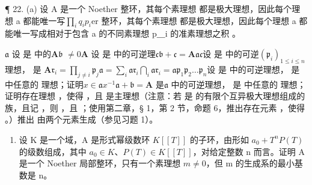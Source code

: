 ¶ 22. (a) 设 A 是一个 Noether 整环，其每个素理想  都是极大理想，因此每个理想 a  都能唯一写\(\prod_{i} q_{i}\)\(p_{i}\)er 整环，其每个素理想  都是极大理想，因此每个理想 a  都能唯一写成相对于包含 a 的不同素理想 p＿i 的准素理想之积 。

 \(\mathfrak{a}\) 设  是  中的\(\mathbf{A}\)\(\mathfrak{b}\)  \(\neq 0\)\(\mathbf{A}\) 设  是  中的可逆理\(\mathfrak{c}\)\(\mathfrak{b} + \mathfrak{c} = \mathbf{A}\)\(\mathfrak{ac}\)设  是  中的可逆\((\mathfrak{p}_i)_{1 \leqslant i \leqslant n}\)理想， 是 \(\mathbf{A}\)\(\mathfrak{r}_i = \prod_{j \neq i} \mathfrak{p}_j\)\(\mathfrak{a} = \sum_i \mathfrak{ar}_i\)\(\bigcap_i \mathfrak{ar}_i = \mathfrak{ap}_1\mathfrak{p}_2 \ldots \mathfrak{p}_n\)设  是  中的可逆理想， 是  中任意的  理想；证明\(x \in \mathfrak{a}\)\(x^{-1}\mathfrak{a} + \mathfrak{b} = \mathbf{A}\) 是\(\mathfrak{a}\)  中的可逆理想， 是  中任意的  理想；证明存在理想 ，使得 ，且  是主理想（注意：若  是  的有限个互异极大理想组成的族，且记 ，则 ，且 ；使用第二章，§ 1，第 2 节，命题 6，推出存在元素 ，使得 。）推出  由两个元素生成（参见习题 1）。

\begin{enumerate}
\def\labelenumi{(\alph{enumi})}
\setcounter{enumi}{1}
\tightlist
\item
  设 K 是一个域，A 是形式幂级数环 \(K[[T]]\) 的子环，由形如 \(a_{0} + T^{n}P(T)\) 的级数组成，其中 \(a_{0} \in K\)、\(P(T) \in K[[T]]\)，对给定整数 n 而言。证明 A 是一个 Noether 局部整环，只有一个素理想 \(m \neq 0\)，但 m 的生成系的最小基数是 n。
\end{enumerate}

